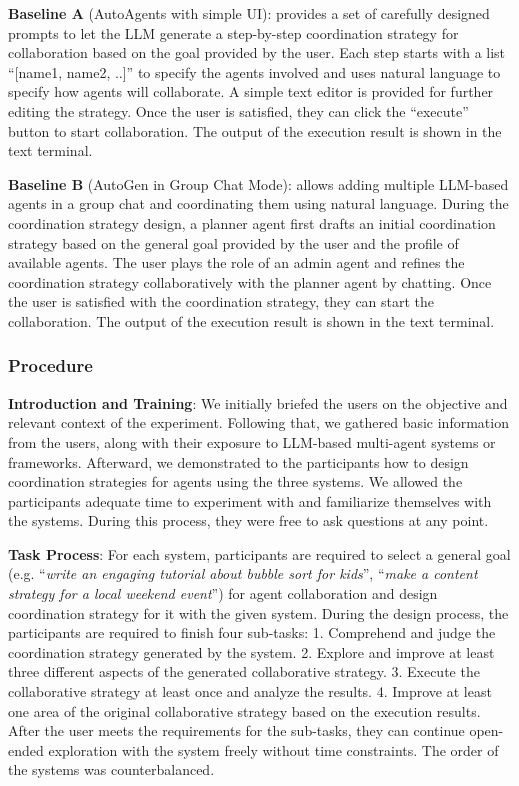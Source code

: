 \textbf{Baseline A} (AutoAgents with simple UI): provides a set of carefully designed prompts to let the LLM generate a step-by-step coordination strategy for collaboration based on the goal provided by the user. Each step starts with a list ``[name1, name2, ..]'' to specify the agents involved and uses natural language to specify how agents will collaborate. A simple text editor is provided for further editing the strategy. Once the user is satisfied, they can click the ``execute'' button to start collaboration. The output of the execution result is shown in the text terminal.

\textbf{Baseline B} (AutoGen in Group Chat Mode): allows adding multiple LLM-based agents in a group chat and coordinating them using natural language. During the coordination strategy design, a planner agent first drafts an initial coordination strategy based on the general goal provided by the user and the profile of available agents. The user plays the role of an admin agent and refines the coordination strategy collaboratively with the planner agent by chatting. Once the user is satisfied with the coordination strategy, they can start the collaboration. The output of the execution result is shown in the text terminal.

\subsubsection{Procedure}
\textbf{Introduction and Training}: We initially briefed the users on the objective and relevant context of the experiment. Following that, we gathered basic information from the users, along with their exposure to LLM-based multi-agent systems or frameworks. Afterward, we demonstrated to the participants how to design coordination strategies for agents using the three systems. We allowed the participants adequate time to experiment with and familiarize themselves with the systems. During this process, they were free to ask questions at any point. 

\textbf{Task Process}: For each system, participants are required to select a general goal (e.g. ``\textit{write an engaging tutorial about bubble sort for kids}'', ``\textit{make a content strategy for a local weekend event}'') for agent collaboration and design coordination strategy for it with the given system. During the design process, the participants are required to finish four sub-tasks: 1. Comprehend and judge the coordination strategy generated by the system. 2. Explore and improve at least three different aspects of the generated collaborative strategy. 3. Execute the collaborative strategy at least once and analyze the results. 4. Improve at least one area of the original collaborative strategy based on the execution results. After the user meets the requirements for the sub-tasks, they can continue open-ended exploration with the system freely without time constraints. The order of the systems was counterbalanced.

